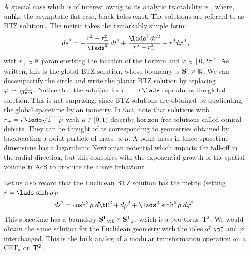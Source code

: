 \documentclass[12pt,openany]{book}
\begin{document}
A special case which is of interest owing to its analytic tractability is , where, unlike the asymptotic flat case, black holes exist. The solutions are referred to as BTZ solution \cite{Banados:1992wn}. The metric takes the remarkably simple form:
%
\begin{equation}
ds^2 = -\frac{r^2 - r_+^2}{\lads^2}\, dt^2 + \frac{\lads^2\, dr^2}{r^2 -r_+^2} + r^2 d\varphi^2 \,,
\label{eq:btz}
\end{equation}
%
with $r_+ \in {\mathbb R}$ parameterizing the location of the horizon and $\varphi \in [0,2\pi]$. As written, this is the global BTZ solution, whose boundary is ${\bf S}^1 \times {\mathbb R}$. We can decompactify the circle and write the planar BTZ solution by replacing $\varphi \to \frac{x}{\lads}$. Notice that the solution for $r_+ = i\,\lads$ reproduces the global  solution. This is not  surprising, since BTZ solutions are obtained by quotienting the global  spacetime by an isometry. In fact, note  that solutions with
$r_+ = i\, \lads \sqrt{1-\mu}$ with  $\mu \in [0,1)$ describe horizon-free solutions called conical defects. They can be thought of as corresponding to geometries obtained by backreacting a point particle of mass $\propto \mu$. A point mass in three spacetime dimensions has a logarithmic Newtonian potential which impacts the fall-off in the radial direction, but this conspires with the exponential growth of the spatial volume in AdS to produce the above behaviour.

Let us also record that the Euclidean BTZ solution has the metric (setting $r = \lads \,\sinh\rho$):
%
\begin{equation}
ds^2 = \cosh^2\rho\;  d\tE^2 + d\rho^2 + \lads^2\, \sinh^2 \rho \; d\varphi^2\,.
\label{eq:eBTZ}
\end{equation}
%
This spacetime has a boundary ${\bf S^1}_{\tE} \times {\bf S^1}_\varphi$, which is  a two-torus ${\bf T}^2$. We would obtain the same solution for  the Euclidean  geometry with the roles of $\tE $ and $\varphi$ interchanged. This is the bulk analog of a modular transformation operation on a  CFT$_2$ on ${\bf T}^2$.
\end{document}
